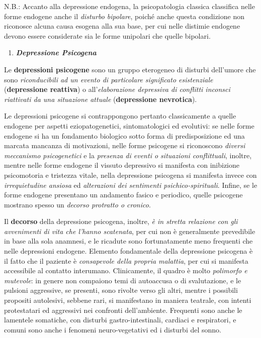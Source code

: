 \documentclass[]{article}
\begin{document}
N.B.: Accanto alla depressione endogena, la psicopatologia classica
classifica nelle forme endogene anche il \emph{disturbo bipolare},
poiché anche questa condizione non riconosce alcuna causa esogena alla
sua base, per cui nelle distimie endogene devono essere considerate sia
le forme unipolari che quelle bipolari.

\begin{enumerate}
\def\labelenumi{\arabic{enumi}.}
\item
  \textbf{\emph{Depressione Psicogena}}
\end{enumerate}

Le \textbf{depressioni psicogene} sono un gruppo eterogeneo di disturbi
dell'umore che sono \emph{riconducibili ad un evento di particolare
significato esistenziale} (\textbf{depressione reattiva}) o
all'\emph{elaborazione depressiva di conflitti inconsci riattivati da
una situazione attuale} (\textbf{depressione nevrotica}).

Le depressioni psicogene si contrappongono pertanto classicamente a
quelle endogene per aspetti eziopatogenetici, sintomatologici ed
evolutivi: se nelle forme endogene si ha un fondamento biologico sotto
forma di predisposizione ed una marcata mancanza di motivazioni, nelle
forme psicogene si riconoscono \emph{diversi meccanismo psicogenetici} e
la \emph{presenza di eventi o situazioni conflittuali}, inoltre, mentre
nelle forme endogene il vissuto depressivo si manifesta con inibizione
psicomotoria e tristezza vitale, nella depressione psicogena si
manifesta invece con \emph{irrequietudine ansiosa} ed \emph{alterazioni
dei sentimenti psichico-spirituali}. Infine, se le forme endogene
presentano un andamento fasico e periodico, quelle psicogene mostrano
spesso un \emph{decorso protratto o cronico}.

Il \textbf{decorso} della depressione psicogena, inoltre, \emph{è in
stretta relazione con gli avvenimenti di vita che l'hanno scatenata},
per cui non è generalmente prevedibile in base alla sola anamnesi, e le
ricadute sono fortunatamente meno frequenti che nelle depressioni
endogene. Elemento fondamentale della depressione psicogena è il fatto
che il paziente è \emph{consapevole della propria malattia}, per cui si
manifesta accessibile al contatto interumano. Clinicamente, il quadro è
molto \emph{polimorfo e mutevole}: in genere non compaiono temi di
autoaccusa o di svalutazione, e le pulsioni aggressive, se presenti,
sono rivolte verso gli altri, mentre i possibili propositi autolesivi,
sebbene rari, si manifestano in maniera teatrale, con intenti
protestatari ed aggressivi nei confronti dell'ambiente. Frequenti sono
anche le lamentele somatiche, con disturbi gastro-intestinali, cardiaci
e respiratori, e comuni sono anche i fenomeni neuro-vegetativi ed i
disturbi del sonno.
\end{document}
